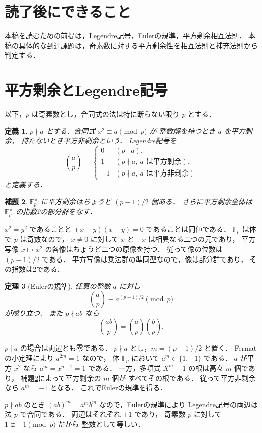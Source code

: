 \documentclass[a5paper,10pt,onecolumn]{jsarticle}
\makeatletter
\theoremstyle{mathnotetheorem}
\newtheorem{theorem}{定理}[section]
\newtheorem{definition}[theorem]{定義}
\newtheorem{lemma}[theorem]{補題}
\renewcommand{\proofname}{証明}
\renewenvironment{proof}[1][\proofname]{%
  \par\pushQED{\qed}\normalfont\topsep4\p@\@plus2\p@\relax
  \trivlist\item[\hskip\labelsep\bfseries #1]\ignorespaces
}{\popQED\endtrivlist\@endpefalse}
\makeatother
\begin{document}
\section*{読了後にできること}
本稿を読むための前提は，Legendre記号，Eulerの規準，平方剰余相互法則．
本稿の具体的な到達課題は，奇素数に対する平方剰余性を相互法則と補充法則から判定する．

\section{平方剰余とLegendre記号}

以下，$p$ は奇素数とし，合同式の法は特に断らない限り $p$ とする．

\begin{definition}
$p\nmid a$ とする．合同式 $x^2\equiv a\pmod p$ が
整数解を持つとき $a$ を\emph{平方剰余}，
持たないとき\emph{平方非剰余}という．
Legendre記号を
\[
 \left(\frac ap\right)=
 \begin{cases}
 0&(p\mid a),\\
 1&(p\nmid a,\ a\text{ は平方剰余}),\\
 -1&(p\nmid a,\ a\text{ は平方非剰余})
 \end{cases}
\]
と定義する．
\end{definition}

\begin{lemma}\label{lem:squares}
$\mathbb F_p^\times$ に平方剰余はちょうど $(p-1)/2$ 個ある．
さらに平方剰余全体は
$\mathbb F_p^\times$ の指数2の部分群をなす．
\end{lemma}
\begin{proof}
$x^2=y^2$ であることと
$(x-y)(x+y)=0$ であることは同値である．
$\mathbb F_p$ は体で $p$ は奇数なので，
$x\ne0$ に対して $x$ と $-x$ は相異なる二つの元であり，
平方写像 $x\mapsto x^2$ の各像はちょうど二つの原像を持つ．
従って像の位数は $(p-1)/2$ である．
平方写像は乗法群の準同型なので，像は部分群であり，
その指数は2である．
\end{proof}

\begin{theorem}[Eulerの規準]\label{thm:euler}
任意の整数 $a$ に対し
\[
 \left(\frac ap\right)\equiv a^{(p-1)/2}\pmod p
\]
が成り立つ．
また $p\nmid ab$ なら
\[
 \left(\frac{ab}{p}\right)
 =\left(\frac ap\right)\left(\frac bp\right).
\]
\end{theorem}
\begin{proof}
$p\mid a$ の場合は両辺とも零である．
$p\nmid a$ とし，$m=(p-1)/2$ と置く．
Fermatの小定理により $a^{2m}=1$ なので，
体 $\mathbb F_p$ において $a^m\in\{1,-1\}$ である．
$a$ が平方 $x^2$ なら
$a^m=x^{p-1}=1$ である．
一方，多項式 $X^m-1$ の根は高々 $m$ 個であり，
補題\ref{lem:squares}によって平方剰余の $m$ 個が
すべてその根である．
従って平方非剰余なら $a^m=-1$ となる．
これでEulerの規準を得る．

$p\nmid ab$ のとき
$(ab)^m=a^mb^m$ なので，Eulerの規準により
Legendre記号の両辺は法 $p$ で合同である．
両辺はそれぞれ $\pm1$ であり，
奇素数 $p$ に対して $1\not\equiv-1\pmod p$ だから
整数として等しい．
\end{proof}
\end{document}
